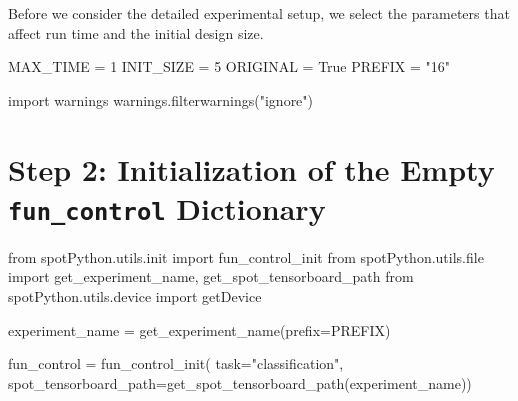 \documentclass[
  letterpaper,
  DIV=11,
  numbers=noendperiod]{scrreprt}
\newenvironment{Shaded}{\begin{snugshade}}{\end{snugshade}}
\newcommand{\BuiltInTok}[1]{\textcolor[rgb]{0.00,0.23,0.31}{#1}}
\newcommand{\DecValTok}[1]{\textcolor[rgb]{0.68,0.00,0.00}{#1}}
\newcommand{\ImportTok}[1]{\textcolor[rgb]{0.00,0.46,0.62}{#1}}
\newcommand{\NormalTok}[1]{\textcolor[rgb]{0.00,0.23,0.31}{#1}}
\newcommand{\OperatorTok}[1]{\textcolor[rgb]{0.37,0.37,0.37}{#1}}
\newcommand{\StringTok}[1]{\textcolor[rgb]{0.13,0.47,0.30}{#1}}
\newcommand{\VariableTok}[1]{\textcolor[rgb]{0.07,0.07,0.07}{#1}}
\begin{document}
Before we consider the detailed experimental setup, we select the
parameters that affect run time and the initial design size.

\begin{Shaded}
\begin{Highlighting}[]
\NormalTok{MAX\_TIME }\OperatorTok{=} \DecValTok{1}
\NormalTok{INIT\_SIZE }\OperatorTok{=} \DecValTok{5}
\NormalTok{ORIGINAL }\OperatorTok{=} \VariableTok{True}
\NormalTok{PREFIX }\OperatorTok{=} \StringTok{"16"}
\end{Highlighting}
\end{Shaded}

\begin{Shaded}
\begin{Highlighting}[]
\ImportTok{import}\NormalTok{ warnings}
\NormalTok{warnings.filterwarnings(}\StringTok{"ignore"}\NormalTok{)}
\end{Highlighting}
\end{Shaded}

\hypertarget{step-2-initialization-of-the-empty-fun_control-dictionary-1}{%
\section{\texorpdfstring{Step 2: Initialization of the Empty
\texttt{fun\_control}
Dictionary}{Step 2: Initialization of the Empty fun\_control Dictionary}}\label{step-2-initialization-of-the-empty-fun_control-dictionary-1}}

\begin{Shaded}
\begin{Highlighting}[]
\ImportTok{from}\NormalTok{ spotPython.utils.init }\ImportTok{import}\NormalTok{ fun\_control\_init}
\ImportTok{from}\NormalTok{ spotPython.utils.}\BuiltInTok{file} \ImportTok{import}\NormalTok{ get\_experiment\_name, get\_spot\_tensorboard\_path}
\ImportTok{from}\NormalTok{ spotPython.utils.device }\ImportTok{import}\NormalTok{ getDevice}

\NormalTok{experiment\_name }\OperatorTok{=}\NormalTok{ get\_experiment\_name(prefix}\OperatorTok{=}\NormalTok{PREFIX)}

\NormalTok{fun\_control }\OperatorTok{=}\NormalTok{ fun\_control\_init(}
\NormalTok{    task}\OperatorTok{=}\StringTok{"classification"}\NormalTok{,}
\NormalTok{    spot\_tensorboard\_path}\OperatorTok{=}\NormalTok{get\_spot\_tensorboard\_path(experiment\_name))}
\end{Highlighting}
\end{Shaded}
\end{document}
